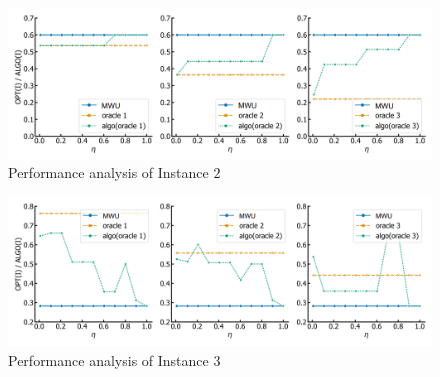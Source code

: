 \begin{figure}[!ht]
    \centering
    \includegraphics[width=\linewidth]{Img/random_result.png}
    \caption{Performance analysis of Instance $2$}
    \label{fig:small-random}
\end{figure}

\begin{figure}[!ht]
    \centering
    \includegraphics[width=\linewidth]{Img/connected_result.png}
    \caption{Performance analysis of Instance $3$}
    \label{fig:connected}
\end{figure}
